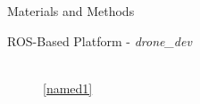 \begin{frame}{Materials and Methods}
\begin{block}{ROS-Based Platform - \textit{drone\_dev}}

	\begin{figure}[!h]
	\centering
	\\
	\hspace{23pt} \ref{named1}
\end{figure}
\end{block}
\end{frame}

